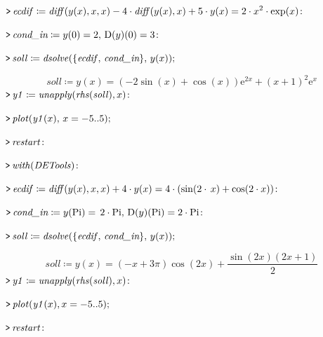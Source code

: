 \documentclass{article}
\begin{document}
\mapleinput
{$ \displaystyle \texttt{>\,} \mathit{ecdif} \coloneqq \mathit{diff} (y (x),x ,x)-4\cdot \mathit{diff} (y (x),x)+5\cdot y (x)=2\cdot x^{2}\cdot \exp (x)\colon  $}

\mapleinput
{$ \displaystyle \texttt{>\,} \textit{cond\_in} \coloneqq y (0)=2,\,\mathrm{D}(y)(0)=3\colon  $}

\mapleinput
{$ \displaystyle \texttt{>\,} \mathit{soll} \coloneqq \mathit{dsolve} (\{\mathit{ecdif} ,\,\textit{cond\_in} \},\,y (x)); $}

\begin{dmath}\label{(24)}
\mathit{soll} \coloneqq y \! \left(x \right)=\left(-2 \sin \! \left(x \right)+\cos \! \left(x \right)\right) {\mathrm e}^{2 x}+\left(x +1\right)^{2} {\mathrm e}^{x}
\end{dmath}
\mapleinput
{$ \displaystyle \texttt{>\,} \mathit{y1} \coloneqq \mathit{unapply} (\mathit{rhs} (\mathit{soll}),x)\colon  $}

\mapleinput
{$ \displaystyle \texttt{>\,} \mathit{plot} (\mathit{y1} (x),\,x =-5..5); $}

{}
\mapleinput
{$ \displaystyle \texttt{>\,} \mathit{restart} \colon  $}

\mapleinput
{$ \displaystyle \texttt{>\,} \mathit{with} (\mathit{DETools})\colon  $}

\mapleinput
{$ \displaystyle \texttt{>\,} \mathit{ecdif} \coloneqq \mathit{diff} (y (x),x ,x)+4\cdot y (x)=4\cdot (\sin (2\cdot \,x)+\cos (2\cdot x))\colon  $}

\mapleinput
{$ \displaystyle \texttt{>\,} \textit{cond\_in} \coloneqq y (\mathrm{Pi})=\,2\cdot \mathrm{Pi},\,\mathrm{D}(y)(\mathrm{Pi})=2\cdot \mathrm{Pi}\colon  $}

\mapleinput
{$ \displaystyle \texttt{>\,} \mathit{soll} \coloneqq \mathit{dsolve} (\{\mathit{ecdif} ,\,\textit{cond\_in} \},\,y (x)); $}

\begin{dmath}\label{(25)}
\mathit{soll} \coloneqq y \! \left(x \right)=\left(-x +3 \pi \right) \cos \! \left(2 x \right)+\frac{\sin \! \left(2 x \right) \left(2 x +1\right)}{2}
\end{dmath}
\mapleinput
{$ \displaystyle \texttt{>\,} \mathit{y1} \coloneqq \mathit{unapply} (\mathit{rhs} (\mathit{soll}),x)\colon  $}

\mapleinput
{$ \displaystyle \texttt{>\,} \mathit{plot} (\mathit{y1} (x),x =-5..5); $}

{}
\mapleinput
{$ \displaystyle \texttt{>\,} \mathit{restart} \colon  $}
\end{document}
